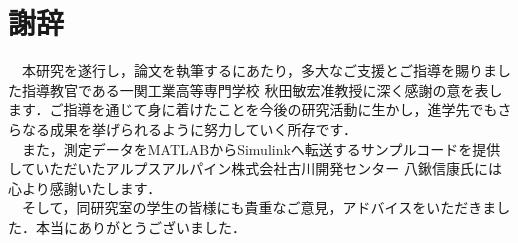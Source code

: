 \chapter*{謝辞}
　本研究を遂行し，論文を執筆するにあたり，多大なご支援とご指導を賜りました指導教官である一関工業高等専門学校 秋田敏宏准教授に深く感謝の意を表します．ご指導を通じて身に着けたことを今後の研究活動に生かし，進学先でもさらなる成果を挙げられるように努力していく所存です．\\
　また，測定データをMATLABからSimulinkへ転送するサンプルコードを提供していただいたアルプスアルパイン株式会社古川開発センター 八鍬信康氏には心より感謝いたします．\\
　そして，同研究室の学生の皆様にも貴重なご意見，アドバイスをいただきました．本当にありがとうございました．
